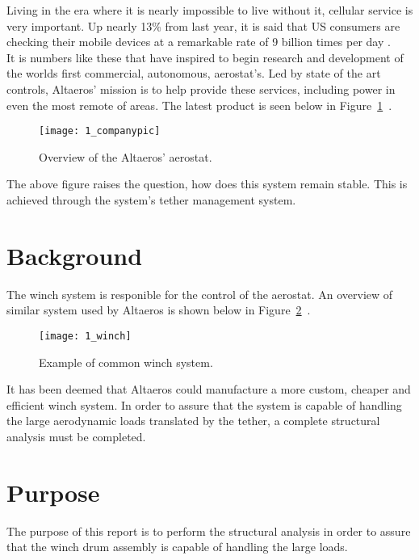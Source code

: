 \label{chapt:intro}

Living in the era where it is nearly impossible to live without it, cellular service is very important. Up nearly 13\% from last year, it is said that US consumers are checking their mobile devices at a remarkable rate of 9 billion times per day \cite{deloittestat}.\\

It is numbers like these that have inspired \Company to begin research and development of the worlds first commercial, autonomous, aerostat's. Led by state of the art controls, Altaeros' mission is to help provide these services, including power in even the most remote of areas. The latest product is seen below in Figure~\ref{fig:1_companypic}~\cite{companypicweb}.

\begin{figure}[H]
    \centering
    \texttt{[image: 1\_companypic]}
    \caption{Overview of the Altaeros' aerostat.}
    \label{fig:1_companypic}
\end{figure}


The above figure raises the question, how does this system remain stable. This is achieved through the system's tether management system.

\section{Background} %

The winch system is responible for the control of the aerostat. An overview of similar system used by Altaeros is shown below in Figure~\ref{fig:1_winch}~\cite{winchpic}.
\begin{figure}[H]
    \centering
    \texttt{[image: 1\_winch]}
    \caption{Example of common winch system.}
    \label{fig:1_winch}
\end{figure}

It has been deemed that Altaeros could manufacture a more custom, cheaper and efficient winch system. In order to assure that the system is capable of handling the large aerodynamic loads translated by the tether, a complete structural analysis must be completed.

\section{Purpose}
The purpose of this report is to perform the structural analysis in order to assure that the winch drum assembly is capable of handling the large loads.\\

